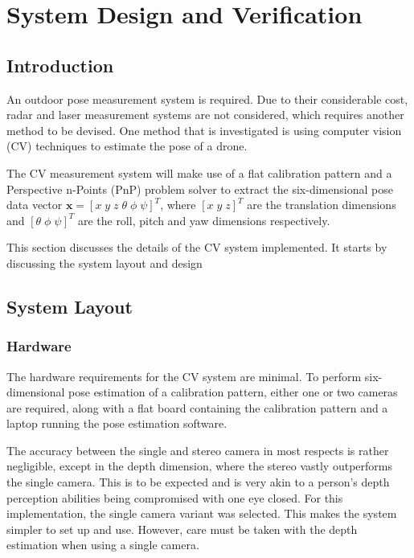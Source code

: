 \chapter{System Design and Verification}

\section{Introduction}

An outdoor pose measurement system is required. Due to their considerable cost, radar and laser measurement systems are not considered, which requires another method to be devised. One method that is investigated is using computer vision (CV) techniques to estimate the pose of a drone. 

The CV measurement system will make use of a flat calibration pattern and a Perspective n-Points (PnP) problem solver to extract the six-dimensional pose data vector $\bm{x} = {[x\;y\;z\;\theta\;\phi\;\psi]}^T$, where ${[x\;y\;z]}^T$ are the translation dimensions and ${[\theta\;\phi\;\psi]}^T$ are the roll, pitch and yaw dimensions respectively. 

This section discusses the details of the CV system implemented. It starts by discussing the system layout and design

\section{System Layout}

\subsection{Hardware}

The hardware requirements for the CV system are minimal. To perform six-dimensional pose estimation of a calibration pattern, either one or two cameras are required, along with a flat board containing the calibration pattern and a laptop running the pose estimation software. 

The accuracy between the single and stereo camera in most respects is rather negligible, except in the depth dimension, where the stereo vastly outperforms the single camera. This is to be expected and is very akin to a person's depth perception abilities being compromised with one eye closed. For this implementation, the single camera variant was selected. This makes the system simpler to set up and use. However, care must be taken with the depth estimation when using a single camera.


